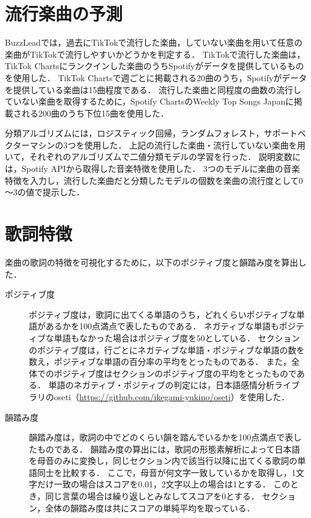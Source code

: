 \documentclass[titlepage]{jsreport}
\begin{document}
\section{流行楽曲の予測}
\label{section:prediction}
BuzzLeadでは，過去にTikTokで流行した楽曲，していない楽曲を用いて任意の楽曲がTikTokで流行しやすいかどうかを判定する．
TikTokで流行した楽曲は，TikTok Chartsにランクインした楽曲のうちSpotifyがデータを提供しているものを使用した．
TikTok Chartsで週ごとに掲載される20曲のうち，Spotifyがデータを提供している楽曲は15曲程度である．
流行した楽曲と同程度の曲数の流行していない楽曲を取得するために，Spotify ChartsのWeekly Top Songs Japanに掲載される200曲のうち下位15曲を使用した．

分類アルゴリズムには，ロジスティック回帰，ランダムフォレスト，サポートベクターマシンの3つを使用した．
上記の流行した楽曲・流行していない楽曲を用いて，それぞれのアルゴリズムで二値分類モデルの学習を行った．
説明変数には，Spotify APIから取得した音楽特徴を使用した．
3つのモデルに楽曲の音楽特徴を入力し，流行した楽曲だと分類したモデルの個数を楽曲の流行度として0～3の値で提示した．

\section{歌詞特徴}

楽曲の歌詞の特徴を可視化するために，以下のポジティブ度と韻踏み度を算出した．

\begin{description}
  \item[ポジティブ度] ポジティブ度は，歌詞に出てくる単語のうち，どれくらいポジティブな単語があるかを100点満点で表したものである．
ネガティブな単語もポジティブな単語もなかった場合はポジティブ度を50としている．
    セクションのポジティブ度は，行ごとにネガティブな単語・ポジティブな単語の数を数え，ポジティブな単語の百分率の平均をとったものである．
    また，全体でのポジティブ度はセクションのポジティブ度の平均をとったものである．
    単語のネガティブ・ポジティブの判定には，日本語感情分析ライブラリのoseti（\url{https://github.com/ikegami-yukino/oseti}）を使用した．
  \item[韻踏み度] 韻踏み度は，歌詞の中でどのくらい韻を踏んでいるかを100点満点で表したものである．
    韻踏み度の算出には，歌詞の形態素解析によって日本語を母音のみに変換し，同じセクション内で該当行以降に出てくる歌詞の単語同士を比較する．
    ここで，母音が何文字一致しているかを取得し，1文字だけ一致の場合はスコアを0.01，2文字以上の場合は1とする．
    このとき，同じ言葉の場合は繰り返しとみなしてスコアを0とする．
    セクション，全体の韻踏み度は共にスコアの単純平均を取っている．
\end{description}
\end{document}

